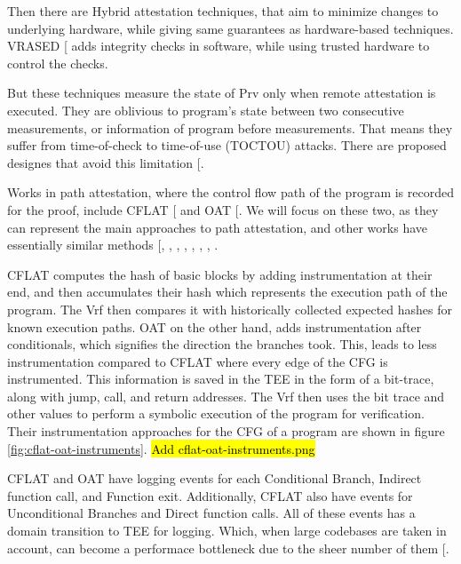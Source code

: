 \documentclass[a4paper, nobind]{templates/ociamthesis}
\begin{document}
Then there are Hybrid attestation techniques, that aim to minimize changes to
underlying hardware, while giving same guarantees as hardware-based techniques.
VRASED {[}\citeproc{ref-nunes2019vrased}{42}{]} adds integrity checks in software, while using trusted hardware to control the checks.

But these techniques measure the state of Prv only when remote attestation is executed.
They are oblivious to program's state between two consecutive measurements, or
information of program before measurements. That means they suffer from
time-of-check to time-of-use (TOCTOU) attacks. There are proposed designes that
avoid this limitation {[}\citeproc{ref-de2021toctou}{24}{]}.

Works in path attestation, where the control flow path of the program is recorded
for the proof, include CFLAT {[}\citeproc{ref-abera2016cflat}{2}{]} and OAT {[}\citeproc{ref-sun2020oat}{53}{]}.
We will focus on these two, as they can represent the main approaches to path
attestation, and other works have essentially similar methods {[}, , , , , , , \citeproc{ref-zhang2021recfa}{58}{]}.

CFLAT computes the hash of basic blocks by adding instrumentation at their end,
and then accumulates their hash which represents the execution path of the program.
The Vrf then compares it with historically collected expected hashes for known
execution paths.
OAT on the other hand, adds instrumentation after conditionals, which signifies
the direction the branches took. This, leads to less instrumentation compared to
CFLAT where every edge of the CFG is instrumented.
This information is saved in the TEE in the form of a bit-trace, along with
jump, call, and return addresses.
The Vrf then uses the bit trace and other values to perform a symbolic execution
of the program for verification.
Their instrumentation approaches for the CFG of a program
are shown in figure \ref{fig:cflat-oat-instruments}.
\hl{Add cflat-oat-instruments.png}

CFLAT and OAT have logging events for each Conditional Branch, Indirect function call, and Function exit.
Additionally, CFLAT also have events for Unconditional Branches and Direct function calls.
All of these events has a domain transition to TEE for logging. Which, when large codebases
are taken in account, can become a performace bottleneck due to the sheer number of them {[}\citeproc{ref-blast}{56}{]}.
\end{document}
